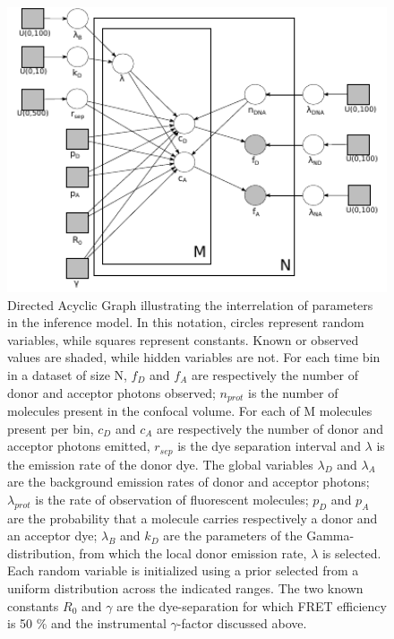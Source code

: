 \begin{figure}[b]
   \begin{center}
      \includegraphics*[width=5in]{inference/S2_plate_DAG_model.pdf}
      \caption{Directed Acyclic Graph illustrating the interrelation of parameters in the inference model.  In this notation, circles represent random variables, while squares represent constants.  Known or observed values are shaded, while hidden variables are not.  For each time bin in a dataset of size N, $f_D$ and $f_A$ are respectively the number of donor and acceptor photons observed; $n_{prot}$ is the number of molecules present in the confocal volume.  For each of M molecules present per bin, $c_{D}$ and $c_{A}$ are respectively the number of donor and acceptor photons emitted, $r_{sep}$ is the dye separation interval and $\lambda$ is the emission rate of the donor dye.  The global variables $\lambda_{D}$ and $\lambda_{A}$ are the background emission rates of donor and acceptor photons; $\lambda_{prot}$ is the rate of observation of fluorescent molecules; $p_{D}$ and $p_{A}$ are the probability that a molecule carries respectively a donor and an acceptor dye; $\lambda_B$ and $k_D$ are the parameters of the Gamma-distribution, from which the local donor emission rate, $\lambda$ is selected.  Each random variable is initialized using a prior selected from a uniform distribution across the indicated ranges.  The two known constants $R_0$ and $\gamma$ are the dye-separation for which FRET efficiency is 50 \% and the instrumental $\gamma$-factor discussed above.}
      \label{fig:plate_DAG}
   \end{center}
\end{figure}


